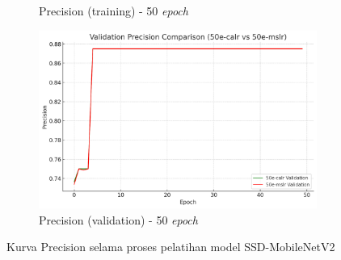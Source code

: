 \begin{figure}[htbp]
\begin{subfigure}{0.45\textwidth}
    \caption{Precision (training) - 50 \emph{epoch}}
  \end{subfigure}
  \hfill
  \begin{subfigure}{0.45\textwidth}
    \includegraphics[width=\textwidth]{gambar/bab4-val-precision-50e.png}
    \caption{Precision (validation) - 50 \emph{epoch}}
  \end{subfigure}
  \caption{Kurva Precision selama proses pelatihan model SSD-MobileNetV2}
  \label{fig:precision_curves}
\end{figure}

